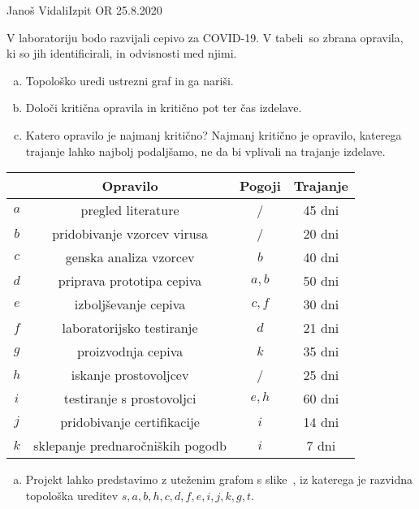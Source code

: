 \begin{naloga}{Janoš Vidali}{Izpit OR 25.8.2020}
\begin{vprasanje}
V laboratoriju bodo razvijali cepivo za COVID-19.
V tabeli~\tab so zbrana opravila, ki so jih identificirali,
 in odvisnosti med njimi.
\begin{enumerate}[(a)]
\item Topološko uredi ustrezni graf in ga nariši.
\item Določi kritična opravila in kritično pot ter čas izdelave.
\item Katero opravilo je najmanj kritično?
Najmanj kritično je opravilo,
katerega trajanje lahko najbolj podaljšamo,
ne da bi vplivali na trajanje izdelave.
\end{enumerate}

\begin{tabela}
\begin{tabular}{c|ccc}
    & Opravilo                         & Pogoji & Trajanje \\ \hline
$a$ & pregled literature               & /      & 45 dni \\
$b$ & pridobivanje vzorcev virusa      & /      & 20 dni \\
$c$ & genska analiza vzorcev           & $b$    & 40 dni \\
$d$ & priprava prototipa cepiva        & $a, b$ & 50 dni \\
$e$ & izboljševanje cepiva             & $c, f$ & 30 dni \\
$f$ & laboratorijsko testiranje        & $d$    & 21 dni \\
$g$ & proizvodnja cepiva               & $k$    & 35 dni \\
$h$ & iskanje prostovoljcev            & /      & 25 dni \\
$i$ & testiranje s prostovoljci        & $e, h$ & 60 dni \\
$j$ & pridobivanje certifikacije       & $i$    & 14 dni \\
$k$ & sklepanje prednaročniških pogodb & $i$    &  7 dni
\end{tabular}
\end{tabela}
\end{vprasanje}

\begin{odgovor}
\begin{enumerate}[(a)]
\item Projekt lahko predstavimo z uteženim grafom s slike~\fig,
iz katerega je razvidna topološka ureditev
$s, a, b, h, c, d, f, e, i, j, k, g, t$.


\end{enumerate}
\end{odgovor}
\end{naloga}
